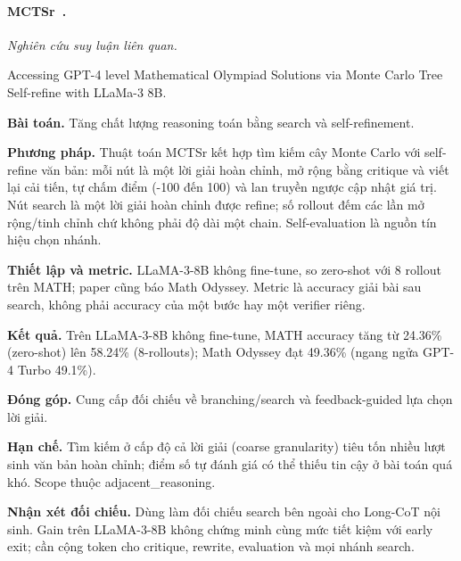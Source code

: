 \begin{samepage}
\paragraph{MCTSr~\cite{rra2_mctsr}.}
\emph{Nghiên cứu suy luận liên quan.}\par
{\raggedright\noindent\small Accessing GPT-4 level Mathematical Olympiad Solutions via Monte Carlo Tree Self-refine with LLaMa-3 8B.\par}
\noindent\textbf{Bài toán.} Tăng chất lượng reasoning toán bằng search và self-refinement.\par
\end{samepage}
\noindent\textbf{Phương pháp.} Thuật toán MCTSr kết hợp tìm kiếm cây Monte Carlo với self-refine văn bản: mỗi nút là một lời giải hoàn chỉnh, mở rộng bằng critique và viết lại cải tiến, tự chấm điểm (-100 đến 100) và lan truyền ngược cập nhật giá trị. Nút search là một lời giải hoàn chỉnh được refine; số rollout đếm các lần mở rộng/tinh chỉnh chứ không phải độ dài một chain. Self-evaluation là nguồn tín hiệu chọn nhánh.\par
\noindent\textbf{Thiết lập và metric.} LLaMA-3-8B không fine-tune, so zero-shot với 8 rollout trên MATH; paper cũng báo Math Odyssey. Metric là accuracy giải bài sau search, không phải accuracy của một bước hay một verifier riêng.\par
\noindent\textbf{Kết quả.} Trên LLaMA-3-8B không fine-tune, MATH accuracy tăng từ 24.36\% (zero-shot) lên 58.24\% (8-rollouts); Math Odyssey đạt 49.36\% (ngang ngửa GPT-4 Turbo 49.1\%).\par
\noindent\textbf{Đóng góp.} Cung cấp đối chiếu về branching/search và feedback-guided lựa chọn lời giải.\par
\noindent\textbf{Hạn chế.} Tìm kiếm ở cấp độ cả lời giải (coarse granularity) tiêu tốn nhiều lượt sinh văn bản hoàn chỉnh; điểm số tự đánh giá có thể thiếu tin cậy ở bài toán quá khó. Scope thuộc adjacent\_reasoning.\par
\begin{samepage}
\noindent\textbf{Nhận xét đối chiếu.} Dùng làm đối chiếu search bên ngoài cho Long-CoT nội sinh. Gain trên LLaMA-3-8B không chứng minh cùng mức tiết kiệm với early exit; cần cộng token cho critique, rewrite, evaluation và mọi nhánh search.\par
{}
\end{samepage}

